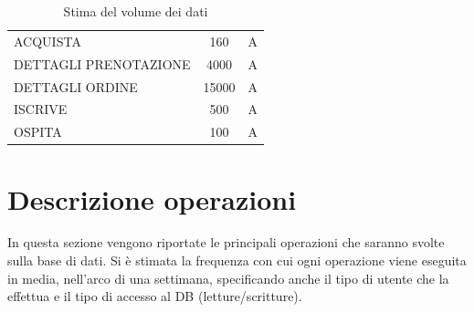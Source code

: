 \documentclass[a4paper,12pt]{report}
\begin{document}
\begin{table}[H]
\begin{tabularx}{\textwidth}{|X|c|c|}
		ACQUISTA              & 160                     & A            \\
		DETTAGLI PRENOTAZIONE & 4000                    & A            \\
		DETTAGLI ORDINE       & 15000                   & A            \\
		ISCRIVE               & 500                     & A            \\
		OSPITA                & 100                     & A            \\
		\hline
	\end{tabularx}
	\caption{Stima del volume dei dati}
\end{table}

\section{Descrizione operazioni}
In questa sezione vengono riportate le principali operazioni che saranno svolte sulla base di dati.
Si è stimata la frequenza con cui ogni operazione viene eseguita in media, nell'arco di una settimana,
specificando anche il tipo di utente che la effettua e il tipo di accesso al DB (letture/scritture).
\end{document}
